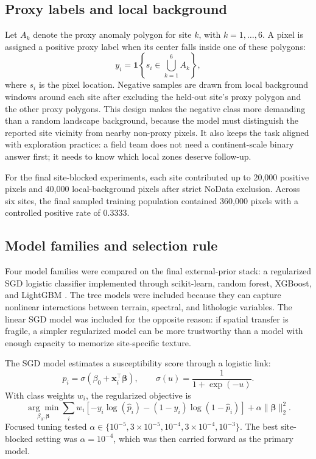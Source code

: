 \documentclass[numrefs]{interact}
\let\cite\citep
\theoremstyle{plain}%
\theoremstyle{definition}
\theoremstyle{remark}
\begin{document}
\subsection{Proxy labels and local background}
Let \(A_k\) denote the proxy anomaly polygon for site \(k\), with \(k=1,\ldots,6\). A pixel is assigned a positive proxy label when its center falls inside one of these polygons:
\begin{equation}
    y_i =
    \mathbf{1}
    \left\{
    s_i \in \bigcup_{k=1}^{6} A_k
    \right\},
    \label{eq:proxy-label}
\end{equation}
where \(s_i\) is the pixel location. Negative samples are drawn from local background windows around each site after excluding the held-out site's proxy polygon and the other proxy polygons. This design makes the negative class more demanding than a random landscape background, because the model must distinguish the reported site vicinity from nearby non-proxy pixels. It also keeps the task aligned with exploration practice: a field team does not need a continent-scale binary answer first; it needs to know which local zones deserve follow-up.

For the final site-blocked experiments, each site contributed up to 20,000 positive pixels and 40,000 local-background pixels after strict NoData exclusion. Across six sites, the final sampled training population contained 360,000 pixels with a controlled positive rate of 0.3333.

\subsection{Model families and selection rule}
Four model families were compared on the final external-prior stack: a regularized SGD logistic classifier implemented through scikit-learn, random forest, XGBoost, and LightGBM \cite{pedregosa2011scikit,breiman2001randomforests,chen2016xgboost,ke2017lightgbm}. The tree models were included because they can capture nonlinear interactions between terrain, spectral, and lithologic variables. The linear SGD model was included for the opposite reason: if spatial transfer is fragile, a simpler regularized model can be more trustworthy than a model with enough capacity to memorize site-specific texture.

The SGD model estimates a susceptibility score through a logistic link:
\begin{equation}
    \hat{p}_i =
    \sigma
    \left(
    \beta_0 + \mathbf{x}_i^{\top}\boldsymbol{\beta}
    \right),
    \qquad
    \sigma(u)=\frac{1}{1+\exp(-u)}.
    \label{eq:sgd-logit}
\end{equation}
With class weights \(w_i\), the regularized objective is
\begin{equation}
    \underset{\beta_0,\boldsymbol{\beta}}{\arg\min}
    \sum_i
    w_i
    \left[
    -y_i\log(\hat{p}_i)
    -(1-y_i)\log(1-\hat{p}_i)
    \right]
    +
    \alpha \lVert \boldsymbol{\beta} \rVert_2^2 .
    \label{eq:sgd-objective}
\end{equation}
Focused tuning tested \(\alpha\in\{10^{-5},3\times10^{-5},10^{-4},3\times10^{-4},10^{-3}\}\). The best site-blocked setting was \(\alpha=10^{-4}\), which was then carried forward as the primary model.
\end{document}
